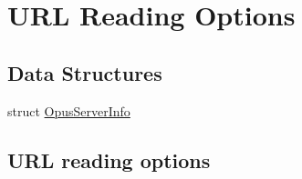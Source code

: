 \hypertarget{group__url__options}{}\section{U\+RL Reading Options}
\label{group__url__options}
\subsection*{Data Structures}
\begin{DoxyCompactItemize}
\item 
struct \hyperlink{struct_opus_server_info}{Opus\+Server\+Info}
\end{DoxyCompactItemize}
\subsection*{U\+RL reading options}
\label{_amgrp723df1257afe999c3e0dda4938bf95e0}%
